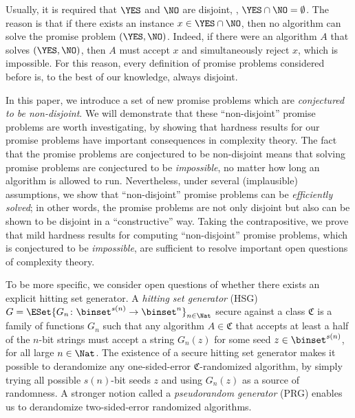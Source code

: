 \documentclass{toc}
\begin{document}
Usually, it is required that $\YES$ and $\NO$ are disjoint, \ie, $\YES \cap \NO = \emptyset$.
The reason is that if there exists an instance $x \in \YES \cap \NO$,
then
no algorithm can solve the promise problem $(\YES, \NO)$.
Indeed, if there were an algorithm $A$ that solves $(\YES, \NO)$,
then
$A$ must accept $x$ and simultaneously reject $x$, which is impossible.
For this reason,
every definition of promise problems considered before
is, to the best of our knowledge,
always disjoint.

In this paper, we introduce a set of new promise problems which are \emph{conjectured to be non-disjoint}.
We will demonstrate that these ``non-disjoint'' promise problems are worth investigating,
by showing
that hardness results for our promise problems have important consequences in complexity theory.
The fact that the promise problems are conjectured to be non-disjoint
means
that
solving promise problems are conjectured to be \emph{impossible},
no matter how long an algorithm is allowed to run.
Nevertheless,
under several (implausible) assumptions,
we show that ``non-disjoint'' promise problems can be \emph{efficiently solved};
in other words, the promise problems are not only disjoint but also can be shown to be disjoint in a ``constructive'' way.
%
%
Taking the contrapositive,
we prove that
mild hardness results for computing ``non-disjoint'' promise problems, which is conjectured to be \emph{impossible},
are sufficient to resolve important open questions of complexity theory.


To be more specific,
we consider open questions of whether there exists an explicit hitting set generator.
A \emph{hitting set generator} (HSG) $G = \ESet{G_n \colon \binset^{s(n)} \to \binset^n}_{n \in \Nat}$
secure against a class $\mathfrak{C}$
is a family of functions $G_n$
such that
any algorithm $A \in \mathfrak{C}$
that accepts at least a half of the $n$-bit strings
must accept a string $G_n(z)$ for some seed $z \in \binset^{s(n)}$,
for all large $n \in \Nat$.
The existence of a secure hitting set generator
makes it possible to
derandomize any one-sided-error $\mathfrak{C}$-randomized algorithm,
by simply trying all possible $s(n)$-bit seeds $z$
and using $G_n(z)$ as a source of randomness.
A stronger notion called a \emph{pseudorandom generator} (PRG) enables us to derandomize two-sided-error randomized algorithms.
\end{document}
